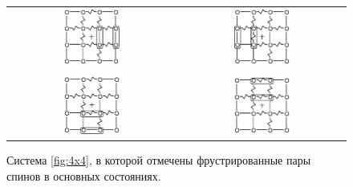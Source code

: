 \documentclass[utf8, babel, sor, jor, amsmath, amssymb, reprint]{elsarticle} %
\begin{document}
\begin{figure}[htbp]
	\centering
	\begin{tabular}{cc}
		\includegraphics[width=0.35\textwidth]{1_Cl1_Type_gs1.eps} & \hspace{0.05\textwidth}
		\includegraphics[width=0.35\textwidth]{1_Cl1_Type_gs2.eps} \\ %
		\vspace{0.5cm} \\
		\includegraphics[width=0.35\textwidth]{1_Cl1_Type_gs3.eps} & \hspace{0.05\textwidth}
		\includegraphics[width=0.35\textwidth]{1_Cl1_Type_gs4.eps} \\ %
	\end{tabular}
	\caption{Система \ref{fig:4x4}, в которой отмечены фрустрированные пары спинов в основных состояниях.}
	\label{fig:4x4.1}
\end{figure}
\end{document}
